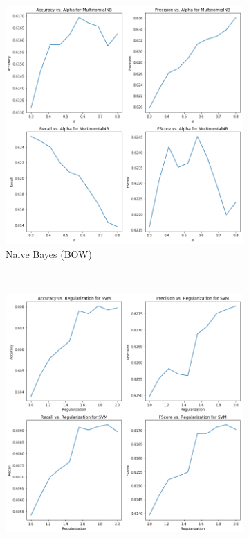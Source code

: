 \documentclass[11pt,a4paper]{article}
\begin{document}
\begin{figure}[h!] %
\centering
	\begin{subfigure}[h!]{0.3\textwidth}
		\includegraphics[width=\linewidth]{plots_nb.png}
		\caption{Naive Bayes (BOW)}
		\label{fig:nb_val}
	\end{subfigure}
	~
	\begin{subfigure}[h!]{0.3\textwidth}
		\includegraphics[width=\linewidth]{plots_svm1.png}

\end{subfigure}
\end{figure}
\end{document}
